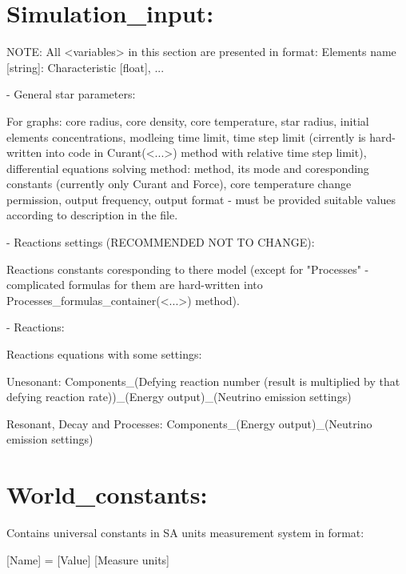 \documentclass[a4paper,12pt]{article}
\begin{document}
\section{Simulation\_input:}

\vspace{1em}

NOTE: All <variables> in this section are presented in format: Elements name [string]: Characteristic [float], ...

\vspace{1em}

- General star parameters:

For graphs: core radius, core density, core temperature, star radius, initial elements concentrations, modleing time limit, time step limit (cirrently is hard-written into code in Curant(<...>) method with relative time step limit), differential equations solving method: method, its mode and coresponding constants (currently only Curant and Force), core temperature change permission, output frequency, output format - must be provided suitable values according to description in the file.

\vspace{1em}

- Reactions settings (RECOMMENDED NOT TO CHANGE):

Reactions constants coresponding to there model (except for "Processes" - complicated formulas for them are hard-written into Processes\_formulas\_container(<...>) method).

\vspace{1em}

- Reactions:

Reactions equations with some settings:

Unesonant: Components\_(Defying reaction number (result is multiplied by that defying reaction rate))\_(Energy output)\_(Neutrino emission settings)

Resonant, Decay and Processes: Components\_(Energy output)\_(Neutrino emission settings)

\section{World\_constants:}

\vspace{1em}

Contains universal constants in SA units measurement system in format:

[Name] = [Value] [Measure units]
\end{document}
